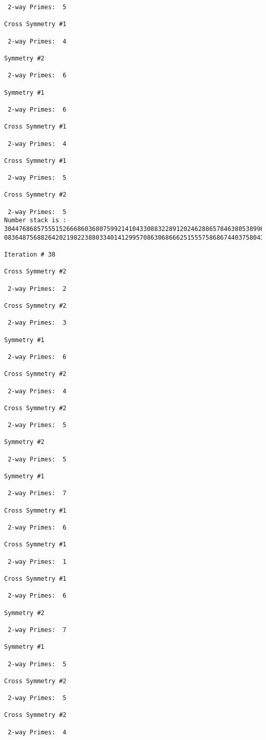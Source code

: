 \begin{verbatim}
 2-way Primes: 	5

Cross Symmetry #1

 2-way Primes: 	4

Symmetry #2

 2-way Primes: 	6

Symmetry #1

 2-way Primes: 	6

Cross Symmetry #1

 2-way Primes: 	4

Cross Symmetry #1

 2-way Primes: 	5

Cross Symmetry #2

 2-way Primes: 	5
Number stack is :
30447686857555152666860368075992141043308832289120246288657846380538996794608835958544046240163340857
08364875688264202198223880334014129957086306866625155575868674403758043361042640445859538806497699835

Iteration #	38

Cross Symmetry #2

 2-way Primes: 	2

Cross Symmetry #2

 2-way Primes: 	3

Symmetry #1

 2-way Primes: 	6

Cross Symmetry #2

 2-way Primes: 	4

Cross Symmetry #2

 2-way Primes: 	5

Symmetry #2

 2-way Primes: 	5

Symmetry #1

 2-way Primes: 	7

Cross Symmetry #1

 2-way Primes: 	6

Cross Symmetry #1

 2-way Primes: 	1

Cross Symmetry #1

 2-way Primes: 	6

Symmetry #2

 2-way Primes: 	7

Symmetry #1

 2-way Primes: 	5

Cross Symmetry #2

 2-way Primes: 	5

Cross Symmetry #2

 2-way Primes: 	4


\end{verbatim}

